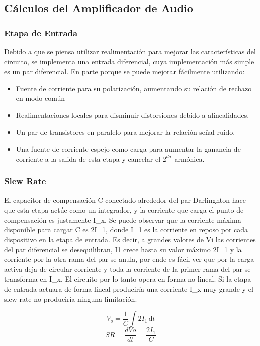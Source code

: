 \subsection{Cálculos del Amplificador de Audio}
\bigskip
\subsubsection{Etapa de Entrada}
Debido a que se piensa utilizar realimentación para mejorar las características del circuito, se implementa una entrada diferencial, cuya implementación más simple es un par diferencial. En parte porque se puede mejorar fácilmente utilizando:

\begin{itemize}
\item Fuente de corriente para su polarización, aumentando su relación de rechazo en modo común
\item Realimentaciones locales para disminuir distorsiones debido a alinealidades.
\item Un par de transistores en paralelo para mejorar la relación señal-ruido.
\item Una fuente de corriente espejo como carga para aumentar la ganancia de corriente a la salida de esta etapa y cancelar el $2^{da}$ armónica.
\end{itemize}

\bigskip
\subsubsection{Slew Rate}

El capacitor de compensación C conectado alrededor del par Darlinghton hace que esta etapa actúe como un integrador, y la corriente que carga el punto de compensación es justamente I\_x. 
Se puede observar que la corriente máxima disponible para cargar C es 2I\_1, donde I\_1 es la corriente en reposo por cada dispositivo en la etapa de entrada. Es decir, a grandes valores de Vi las corrientes del par diferencial se desequilibran, I1 crece hasta su valor máximo 2I\_1 y la corriente por la otra rama del par se anula, por ende es fácil ver que por la carga activa deja de circular corriente y toda la corriente de la primer rama del par se transforma en I\_x.
El circuito por lo tanto opera en forma no lineal. Si la etapa de entrada actuara de forma lineal produciría una corriente I\_x muy grande y el slew rate no produciría ninguna limitación.

\[
	V_o= \dfrac{1}{C} \int 2I_1\,\mathrm{d}t    
\]
$$
	SR=\dfrac{dVo}{dt}=\dfrac{2I_1}{C}
$$

